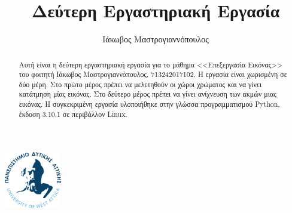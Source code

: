 \documentclass[
  11pt,
  singlespacing,
  liststotoc,
  toctotoc,
  headspline
]{fphw}
\title{Δεύτερη Εργαστηριακή Εργασία}
\author{Ιάκωβος Μαστρογιαννόπουλος}
\institute{Πανεπιστημιο Δυτικης Αττικης \\ Τμημα Μηχανικων Πληροφορικης και Υπολογιστων}
\begin{document}
\includegraphics[width=25mm]{Figures/Logo}
\maketitle

\begin{abstract}
  Αυτή είναι η δεύτερη εργαστηριακή εργασία για το μάθημα <<Επεξεργασία Εικόνας>> του φοιτητή Ιάκωβος Μαστρογιαννόπουλος, 713242017102. Η εργασία είναι χωρισμένη σε δύο μέρη. Στο πρώτο μέρος πρέπει να μελετηθούν οι χώροι χρώματος και να γίνει κατάτμηση μίας εικόνας. Στο δεύτερο μέρος πρέπει να γίνει ανίχνευση των ακμών μιας εικόνας. Η συγκεκριμένη εργασία υλοποιήθηκε στην γλώσσα προγραμματισμού Python, έκδοση 3.10.1 σε περιβάλλον Linux.
\end{abstract}

\newpage
\tableofcontents
\listoffigures
\listoftables

\newpage

\end{document}
